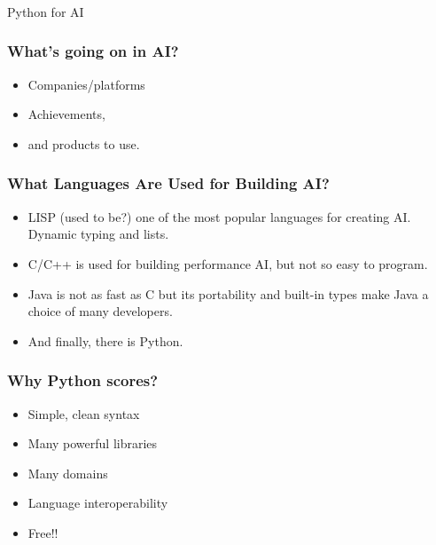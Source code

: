 \begin{frame}[fragile]\frametitle{}
\begin{center}
{\Large Python for AI}
\end{center}

\end{frame}


\begin{frame}[fragile]\frametitle{What's going on in AI?}
\begin{itemize}
\item Companies/platforms
\item Achievements, 
\item and products to use. 
\end{itemize}
\end{frame}

\begin{frame}[fragile]\frametitle{What Languages Are Used for Building AI?}
\begin{itemize}
\item LISP (used to be?) one of the most popular languages for creating AI. Dynamic typing and lists.
\item C/C++ is used for building performance AI, but not so easy to program.
\item  Java is not as fast as C but its portability and built-in types make Java a choice of many developers. 
\item And finally, there is Python. 
\end{itemize}
\end{frame}

\begin{frame}[fragile]\frametitle{Why Python scores?}
\begin{itemize}
\item Simple, clean syntax
\item Many powerful libraries
\item Many domains
\item Language interoperability
\item Free!!
\end{itemize}
\end{frame}

